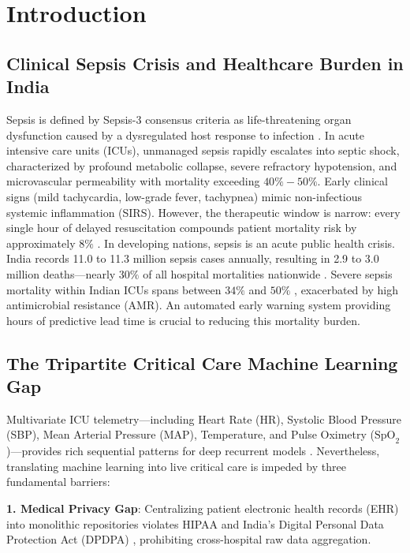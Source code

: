 \documentclass{llncs}
\begin{document}
\section{Introduction}
\label{sec:intro}

\subsection{Clinical Sepsis Crisis and Healthcare Burden in India}
Sepsis is defined by Sepsis-3 consensus criteria as life-threatening organ dysfunction caused by a dysregulated host response to infection \cite{dusing2025sepsis}. In acute intensive care units (ICUs), unmanaged sepsis rapidly escalates into septic shock, characterized by profound metabolic collapse, severe refractory hypotension, and microvascular permeability with mortality exceeding $40\%-50\%$. Early clinical signs (mild tachycardia, low-grade fever, tachypnea) mimic non-infectious systemic inflammation (SIRS). However, the therapeutic window is narrow: every single hour of delayed resuscitation compounds patient mortality risk by approximately $8\%$ \cite{qayyum2023fedsepsis}. In developing nations, sepsis is an acute public health crisis. India records 11.0 to 11.3 million sepsis cases annually, resulting in 2.9 to 3.0 million deaths---nearly $30\%$ of all hospital mortalities nationwide \cite{kalakoti2025fedxai}. Severe sepsis mortality within Indian ICUs spans between $34\%$ and $50\%$ \cite{dusing2025sepsis}, exacerbated by high antimicrobial resistance (AMR). An automated early warning system providing hours of predictive lead time is crucial to reducing this mortality burden.

\subsection{The Tripartite Critical Care Machine Learning Gap}
Multivariate ICU telemetry---including Heart Rate (HR), Systolic Blood Pressure (SBP), Mean Arterial Pressure (MAP), Temperature, and Pulse Oximetry ($\text{SpO}_2$)---provides rich sequential patterns for deep recurrent models \cite{larocca2021attention, amato2023clustering}. Nevertheless, translating machine learning into live critical care is impeded by three fundamental barriers:

\noindent\textbf{1. Medical Privacy Gap}: Centralizing patient electronic health records (EHR) into monolithic repositories violates HIPAA and India's Digital Personal Data Protection Act (DPDPA) \cite{gupta2025privacy}, prohibiting cross-hospital raw data aggregation.
\end{document}
